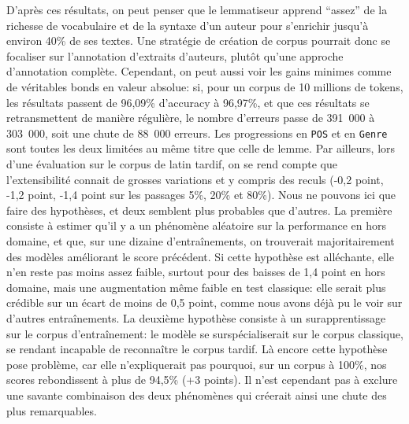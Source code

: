 D'après ces résultats, on peut penser que le lemmatiseur apprend \enquote{assez} de la richesse de vocabulaire et de la syntaxe d'un auteur pour s'enrichir jusqu'à environ 40\% de ses textes. Une stratégie de création de corpus pourrait donc se focaliser sur l'annotation d'extraits d'auteurs, plutôt qu'une approche d'annotation complète. Cependant, on peut aussi voir les gains minimes comme de véritables bonds en valeur absolue: si, pour un corpus de 10 millions de tokens, les résultats passent de 96,09\% d'accuracy à 96,97\%, et que ces résultats se retransmettent de manière régulière, le nombre d'erreurs passe de 391~000 à 303~000, soit une chute de 88~000 erreurs. Les progressions en \texttt{POS} et en \texttt{Genre} sont toutes les deux limitées au même titre que celle de lemme. Par ailleurs, lors d'une évaluation sur le corpus de latin tardif, on se rend compte que l'extensibilité connait de grosses variations et y compris des reculs (-0,2 point, -1,2 point, -1,4 point sur les passages 5\%, 20\% et 80\%). Nous ne pouvons ici que faire des hypothèses, et deux semblent plus probables que d'autres. La première consiste à estimer qu'il y a un phénomène aléatoire sur la performance en hors domaine, et que, sur une dizaine d'entraînements, on trouverait majoritairement des modèles améliorant le score précédent. Si cette hypothèse est alléchante, elle n'en reste pas moins assez faible, surtout pour des baisses de 1,4 point en hors domaine, mais une augmentation même faible en test classique: elle serait plus crédible sur un écart de moins de 0,5 point, comme nous avons déjà pu le voir sur d'autres entraînements. La deuxième hypothèse consiste à un surapprentissage sur le corpus d'entraînement: le modèle se surspécialiserait sur le corpus classique, se rendant incapable de reconnaître le corpus tardif. Là encore cette hypothèse pose problème, car elle n'expliquerait pas pourquoi, sur un corpus à 100\%, nos scores rebondissent à plus de 94,5\% (+3 points). Il n'est cependant pas à exclure une savante combinaison des deux phénomènes qui créerait ainsi une chute des plus remarquables.




